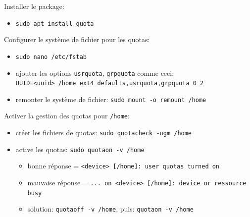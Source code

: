 \documentclass[a4paper]{article}
\begin{document}
\begin{itemize}
\begin{example}
    Installer le package:
    \begin{itemize}
        \item \texttt{sudo apt install quota}
    \end{itemize}
    Configurer le système de fichier pour les quotas:
    \begin{itemize}
        \item \texttt{sudo nano /etc/fstab}
        \item ajouter les options \texttt{usrquota}, \texttt{grpquota} comme ceci: \\
        \texttt{UUID=<uuid> /home ext4 defaults,usrquota,grpquota 0 2}
        \item remonter le système de fichier: \texttt{sudo mount -o remount /home}
    \end{itemize}
    Activer la gestion des quotas pour \texttt{/home}:
    \begin{itemize}
        \item créer les fichiers de quotas: \texttt{sudo quotacheck -ugm /home}
        \item active les quotas: \texttt{sudo quotaon -v /home}
        \begin{example}
            \begin{itemize}
                \item bonne réponse = \texttt{<device> [/home]: user quotas turned on}
                \item mauvaise réponse = \texttt{... on <device> [/home]: device or ressource busy}
                \item solution: \texttt{quotaoff -v /home}, puis: \texttt{quotaon -v /home}
            \end{itemize}
        \end{example}
    \end{itemize}
\end{example}


\end{itemize}
\end{document}

